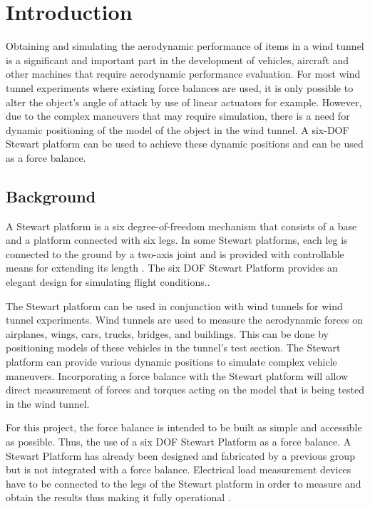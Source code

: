 \section{Introduction}
\label{sec:introduction}
Obtaining and simulating the aerodynamic performance of items in a wind tunnel is a
significant and important part in the development of vehicles, aircraft and other machines
that require aerodynamic performance evaluation. For most wind tunnel experiments where existing force balances are used,
it is only possible to alter the object's angle of attack by use of linear  actuators for example.
However, due to the complex maneuvers that
may require simulation, there is a need for dynamic positioning of the model of the object
in the wind tunnel. A six-DOF Stewart platform can be used to achieve these dynamic positions and can be used as a force balance.
\subsection{Background}
A Stewart platform is a six degree-of-freedom mechanism that consists of a base and a platform connected with six legs. In some Stewart platforms,
each leg is connected to the ground by a two-axis joint and is provided with controllable means for extending its length
\cite{wittenburg2016stewart}. The six DOF Stewart Platform provides an elegant design for simulating flight conditions.\cite{stewart1965platform}.

The Stewart platform can be used in conjunction with wind tunnels for wind tunnel experiments. Wind tunnels are used to measure the aerodynamic forces on airplanes, wings, cars, trucks, bridges, and buildings. This can be done by positioning models of these vehicles in the tunnel's test section.
The Stewart platform can provide various dynamic positions to simulate complex vehicle maneuvers. Incorporating a force balance with the Stewart platform will allow direct measurement of forces and torques acting on the model that is being tested in the wind tunnel.

For this project, the force balance is intended to be built as simple and accessible as possible. Thus, the use of a six DOF Stewart Platform as a force balance.
A Stewart Platform has already been designed and fabricated by a previous group but is not integrated with a force balance.
Electrical load measurement devices have to be connected to the legs of the Stewart platform in order to measure and obtain the results thus making it fully operational \cite{caleb}.

